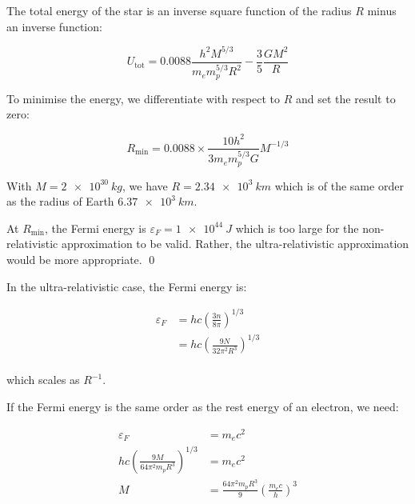 \documentclass[12pt]{article}
\begin{document}
The total energy of the star is an inverse square function of the radius $R$ minus an inverse function:

\begin{equation}
    U_{\text{tot}} = 0.0088 \frac{h^{2}M^{5/3}}{m_{e}m_{p}^{5/3}R^{2}} - \frac{3}{5} \frac{GM^{2}}{R}
\end{equation}

To minimise the energy, we differentiate with respect to $R$ and set the result to zero:

\begin{equation}
    R_{\text{min}} = 0.0088 \times \frac{10h^{2}}{3m_{e}m_{p}^{5/3}G} M^{-1/3}
\end{equation}

With $M = \qty{2e30}{kg}$, we have $R = \qty{2.34e3}{km}$ which is of the same order as the radius of Earth $\qty{6.37e3}{km}$.

At $R_{\text{min}}$, the Fermi energy is $\varepsilon_{F} = \qty{1e44}{J}$ which is too large for the non-relativistic approximation to be valid. Rather, the ultra-relativistic approximation would be more appropriate.
\qed



In the ultra-relativistic case, the Fermi energy is:

\begin{equation}
    \begin{split}
        \varepsilon_{F} &= h c \left( \frac{3n}{8\pi} \right)^{1/3} \\
        &= hc \left( \frac{9N}{32\pi^{2} R^{3}} \right)^{1/3} \\
    \end{split}
\end{equation}

which scales as $R^{-1}$.

If the Fermi energy is the same order as the rest energy of an electron, we need:

\begin{equation}
    \begin{split}
        \varepsilon_{F} &= m_{e} c^{2} \\
        hc \left( \frac{9M}{64\pi^{2} m_{p} R^{3}} \right)^{1/3} &= m_{e} c^{2} \\
        M &= \frac{64\pi^{2} m_{p} R^{3}}{9} \left( \frac{m_{e} c}{h} \right)^{3}
    \end{split}
\end{equation}
\end{document}
